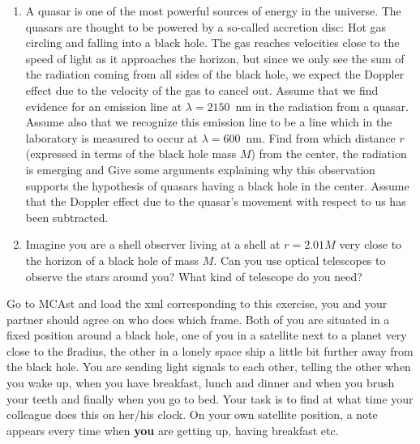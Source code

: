 {\begin{multicols}{2}
\begin{enumerate}
\begin{enumerate}
\item For light coming from far away and entering the gravitational field of the Earth, an opposite effect is taking place. The light is blue shifted. Find the ratio $M/r$ for the surface of the Earth.
\item Find the gravitational blue shift $\Delta\lambda/\lambda$ for light arriving at Earth (note: now the light is coming into the gravitational field instead of travelling out out it, what difference does that make in point 1 above?). Does this change the apparent color of the Sun?
\end{enumerate}
\item A quasar is one of the most powerful sources of energy in the universe. The quasars are thought to be powered by a so-called accretion disc: Hot gas circling and falling into a black hole. The gas reaches velocities close to the speed of light as it approaches the horizon, but since we only see the sum of the radiation coming from all sides of the black hole, we expect the Doppler effect due to the velocity of the gas to cancel out. Assume that we find evidence for an emission line at $\lambda=2150$~nm in the radiation from a quasar. Assume also that we recognize this emission line to be a line which in the laboratory is measured to occur at $\lambda=600$~nm. Find from which distance $r$ (expressed in terms of the black hole mass $M$) from the center, the radiation is emerging and Give some arguments explaining why this observation supports the hypothesis of quasars having a black hole in the center. Assume that the Doppler effect due to the quasar's movement with respect to us has been subtracted.
\item Imagine you are a shell observer living at a shell at $r=2.01M$ very close to the horizon of a black hole of mass $M$. Can you use optical telescopes to observe the stars around you? What kind of telescope do you need?
\end{enumerate}

\vspace{0.5cm}


Go to MCAst and load the xml corresponding to this exercise, you and your partner should agree on who does which frame.
Both of you are situated in a fixed position around a black hole, one of you in a satellite next to a planet very close to the \ss radius, the other in a lonely space ship a little bit further away from the black hole. You are sending light signals to each other, telling the other when you wake up, when you have breakfast, lunch and dinner and when you brush your teeth and finally when you go to bed. Your task is to find at what time your colleague does this on her/his clock. On your own satellite position, a note appears every time when {\bf you} are getting up, having breakfast etc.


\end{multicols}}
